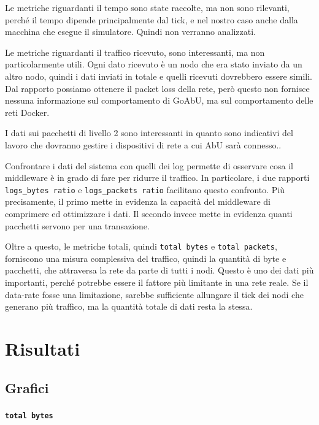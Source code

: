 \documentclass[12pt, a4paper]{article}
\begin{document}
Le metriche riguardanti il tempo sono state raccolte, ma non sono rilevanti, perché il tempo dipende principalmente dal tick, e nel nostro caso anche dalla macchina che esegue il simulatore. Quindi non verranno analizzati.

Le metriche riguardanti il traffico ricevuto, sono interessanti, ma non particolarmente utili. Ogni dato ricevuto è un nodo che era stato inviato da un altro nodo, quindi i dati inviati in totale e quelli ricevuti dovrebbero essere simili.
Dal rapporto possiamo ottenere il packet loss della rete, però questo non fornisce nessuna informazione sul comportamento di GoAbU, ma sul comportamento delle reti Docker.

I dati sui pacchetti di livello 2 sono interessanti in quanto sono indicativi del lavoro che dovranno gestire i dispositivi di rete a cui AbU sarà connesso..

Confrontare i dati del sistema con quelli dei log permette di osservare cosa il middleware è in grado di fare per ridurre il traffico. In particolare, i due rapporti \lstinline{logs_bytes ratio} e \lstinline{logs_packets ratio} facilitano questo confronto.
Più precisamente, il primo mette in evidenza la capacità del middleware di comprimere ed ottimizzare i dati.
Il secondo invece mette in evidenza quanti pacchetti servono per una transazione.

Oltre a questo, le metriche totali, quindi \lstinline{total bytes} e \lstinline{total packets}, forniscono una misura complessiva del traffico, quindi la quantità di byte e pacchetti, che attraversa la rete da parte di tutti i nodi.
Questo è uno dei dati più importanti, perché potrebbe essere il fattore più limitante in una rete reale. Se il data-rate fosse una limitazione, sarebbe sufficiente allungare il tick dei nodi che generano più traffico, ma la quantità totale di dati resta la stessa.

\newpage

\section{Risultati}

\subsection{Grafici}

\paragraph{\lstinline{total bytes}}
\end{document}

